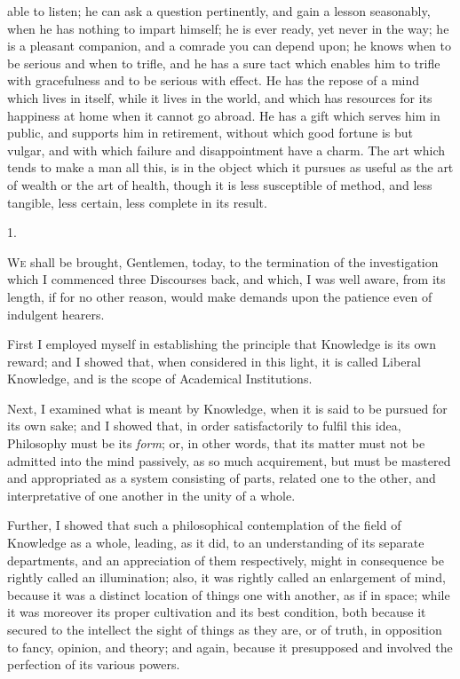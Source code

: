 able to listen; he can ask a question pertinently, and gain a lesson
seasonably, when he has nothing to impart himself; he is ever ready,
yet never in the way; he is a pleasant companion, and a comrade you
can depend upon; he knows when to be serious and when to trifle, and
he has a sure tact which enables him to trifle with gracefulness and
to be serious with effect. He has the repose of a mind which lives in
itself, while it lives in the world, and which has resources for its
happiness at home when it cannot go abroad. He has a gift which serves
him in public, and supports him in retirement, without which good
fortune is but vulgar, and with which failure and disappointment have
a charm. The art which tends to make a man all this, is in the object
which it pursues as useful as the art of wealth or the art of health,
though it is less susceptible of method, and less tangible, less
certain, less complete in its result.


1.

W\textsc{e} shall be brought, Gentlemen, today, to the termination of
the investigation which I commenced three Discourses back, and which,
I was well aware, from its length, if for no other reason, would make
demands upon the patience even of indulgent hearers.

First I employed myself in establishing the principle that
Knowledge is its own reward; and I showed that, when considered in
this light, it is called Liberal Knowledge, and is the scope of
Academical Institutions.

Next, I examined what is meant by Knowledge, when it is said to be
pursued for its own sake; and I showed that, in order satisfactorily
to fulfil this idea, Philosophy must be its \emph{form}; or, in other
words, that its matter must not be admitted into the mind passively,
as so much acquirement, but must be mastered and appropriated as a
system consisting of parts, related one to the other, and
interpretative of one another in the unity of a whole.

Further, I showed that such a philosophical contemplation of the
field of Knowledge as a whole, leading, as it did, to an understanding
of its separate departments, and an appreciation of them respectively,
might in consequence be rightly called an illumination; also, it was
rightly called an enlargement of mind, because it was a distinct
location of things one with another, as if in space; while it was
moreover its proper cultivation and its best condition, both because
it secured to the intellect the sight of things as they are, or of
truth, in opposition to fancy, opinion, and theory; and again, because
it presupposed and involved the perfection of its various powers.

